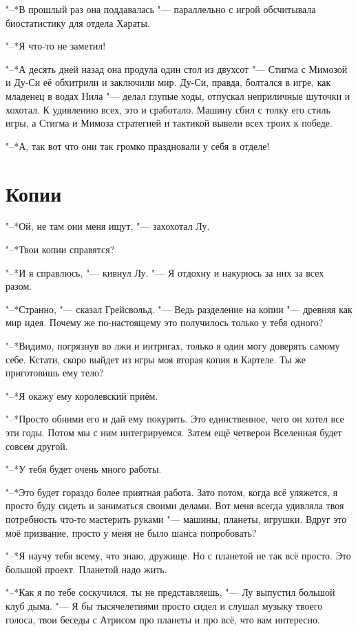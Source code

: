 "--*В прошлый раз она поддавалась "--- параллельно с игрой обсчитывала биостатистику для отдела Хараты.

"--*Я что-то не заметил!

"--*А десять дней назад она продула один стол из двухсот "--- Стигма с Мимозой и Ду-Си её обхитрили и заключили мир.
Ду-Си, правда, болтался в игре, как младенец в водах Нила "--- делал глупые ходы, отпускал неприличные шуточки и хохотал.
К удивлению всех, это и сработало.
Машину сбил с толку его стиль игры, а Стигма и Мимоза стратегией и тактикой вывели всех троих к победе.

"--*А, так вот что они так громко праздновали у себя в отделе!

\section{Копии}

"--*Ой, не там они меня ищут, "--- захохотал Лу.

"--*Твои копии справятся?

"--*И я справлюсь, "--- кивнул Лу.
"--- Я отдохну и накурюсь за них за всех разом.

"--*Странно, "--- сказал Грейсвольд.
"--- Ведь разделение на копии "--- древняя как мир идея.
Почему же по-настоящему это получилось только у тебя одного?

"--*Видимо, погрязнув во лжи и интригах, только я один могу доверять самому себе.
Кстати, скоро выйдет из игры моя вторая копия в Картеле.
Ты же приготовишь ему тело?

"--*Я окажу ему королевский приём.

"--*Просто обними его и дай ему покурить.
Это единственное, чего он хотел все эти годы.
Потом мы с ним интегрируемся.
Затем ещё четверо\ldotst и Вселенная будет совсем другой.

"--*У тебя будет очень много работы.

"--*Это будет гораздо более приятная работа.
Зато потом, когда всё уляжется, я просто буду сидеть и заниматься своими делами.
Вот меня всегда удивляла твоя потребность что-то мастерить руками "--- машины, планеты, игрушки.
Вдруг это моё призвание, просто у меня не было шанса попробовать?

"--*Я научу тебя всему, что знаю, дружище.
Но с планетой не так всё просто.
Это большой проект.
Планетой надо жить.

"--*Как я по тебе соскучился, ты не представляешь, "--- Лу выпустил большой клуб дыма.
"--- Я бы тысячелетиями просто сидел и слушал музыку твоего голоса, твои беседы с Атрисом про планеты и про всё, что вам интересно.

